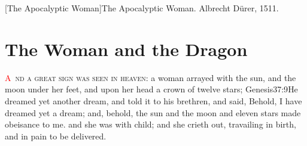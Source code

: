 [The Apocalyptic Woman]{The Apocalyptic Woman. Albrecht Dürer, 1511.}

\chapter{The Woman and the Dragon}
\lettrine[lines=3,slope=0.5em]{\textcolor{red}{A}}{\ nd a great sign was seen in heaven}:%
 a woman arrayed with the sun, and the moon under her feet, and upon her head a crown of twelve stars; %
 					   {Genesis}{37:9}{He dreamed yet another dream, and told it to his brethren, and said, Behold, I have dreamed yet a dream; and, behold, the sun and the moon and eleven stars made obeisance to me.}
 and she was with child; and she crieth out, travailing in birth, and in pain to be delivered. %

